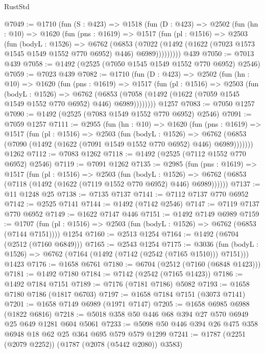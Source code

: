 \begin{lexlean}{RustStd}
\begin{coremodule}
{\begin{coremodule}
{{{{{{{{{{{{{@7049 := @1710
    (fun (S : @423) =>
    @1518
      (fun (D : @423) =>
      @2502
        (fun (hn : @10) =>
        @1620
          (fun (pns : @1619) =>
          @1517
            (fun (pl : @1516) =>
            @2503
              (fun (bodyL : @1526) =>
              @6762
                (@6853
                  (@7022
                    (@1492 (@1622 (@7023 @1573 @1545 @1549 @1552 @770 @6952) @446) @6989)))))))))
    @439
@7050 := @7013 @439
@7058 := @1492 (@2525 (@7050 @1545 @1549 @1552 @770 @6952) @2546)
@7059 := @7023 @439
@7082 := @1710
    (fun (D : @423) =>
    @2502
      (fun (hn : @10) =>
      @1620
        (fun (pns : @1619) =>
        @1517
          (fun (pl : @1516) =>
          @2503
            (fun (bodyL : @1526) =>
            @6762
              (@6853 (@7058 (@1492 (@1622 (@7059 @1545 @1549 @1552 @770 @6952) @446) @6989))))))))
    @1257
@7083 := @7050 @1257
@7090 := @1492 (@2525 (@7083 @1549 @1552 @770 @6952) @2546)
@7091 := @7059 @1257
@7111 := @2955
    (fun (hn : @10) =>
    @1620
      (fun (pns : @1619) =>
      @1517
        (fun (pl : @1516) =>
        @2503
          (fun (bodyL : @1526) =>
          @6762 (@6853 (@7090 (@1492 (@1622 (@7091 @1549 @1552 @770 @6952) @446) @6989)))))))
    @1262
@7112 := @7083 @1262
@7118 := @1492 (@2525 (@7112 @1552 @770 @6952) @2546)
@7119 := @7091 @1262
@7135 := @2985
    (fun (pns : @1619) =>
    @1517
      (fun (pl : @1516) =>
      @2503
        (fun (bodyL : @1526) =>
        @6762 (@6853 (@7118 (@1492 (@1622 (@7119 @1552 @770 @6952) @446) @6989))))))
@7137 := @11 @1248 @25
@7138 := @7135 @7137
@7141 := @7112 @7137 @770 @6952
@7142 := @2525 @7141
@7144 := @1492 (@7142 @2546)
@7147 := @7119 @7137 @770 @6952
@7149 := @1622 @7147 @446
@7151 := @1492 @7149 @6989
@7159 := @1707
    (fun (pl : @1516) => @2503 (fun (bodyL : @1526) => @6762 (@6853 (@7144 @7151))))
    @1254
@7160 := @2513 @1254
@7164 := @1492 (@6704 (@2512 (@7160 @6849)))
@7165 := @2543 @1254
@7175 := @3036
    (fun (bodyL : @1526) => @6762 (@7164 (@1492 (@7142 (@2542 (@7165 @1510))) @7151)))
    @1423
@7176 := @1658 @6761
@7180 := @6704 (@2512 (@7160 (@6848 @1423)))
@7181 := @1492 @7180
@7184 := @7142 (@2542 (@7165 @1423))
@7186 := @1492 @7184 @7151
@7189 := @7176 (@7181 @7186) @5082
@7193 := @1658 @7180 @7186 (@1817 @6703)
@7197 := @1658 @7184 @7151 (@3073 @7141)
@7201 := @1658 @7149 @6989 (@1971 @7147)
@7205 := @1658 @6985 @6988 (@1822 @6816)
@7218 := @5018 @358 @50 @446 @68 @394 @27 @570 @6949 @25 @649 @1281 @604 @5061
@7233 := @5098 @50 @446 @394 @26 @475 @358 @6948 @18 @62 @25 @364 @695 @579 @579 @1299
@7241 := @1787 (@2251 (@2079 @2252)) (@1787 (@2078 (@5442 @2080)) @3583)
}}}}}}}}}}}}}
\end{coremodule}}
\end{coremodule}
\end{lexlean}
